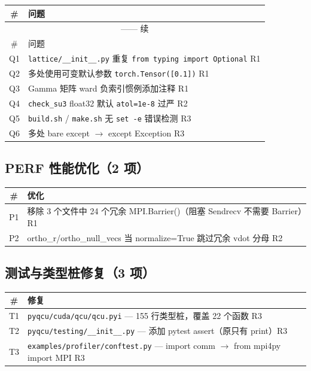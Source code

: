 \documentclass[11pt,a4paper]{article}
\newcommand{\perf}{\textcolor{severityperf}{\textbf{PERF}}}
\begin{document}
\begin{longtable}{cl}
\toprule
\# & 问题 \\
\midrule
\endfirsthead
\multicolumn{2}{c}{\tablename{} \thetable{} —— 续} \\
\midrule
\# & 问题 \\
\midrule
\endhead
\bottomrule
\endfoot
Q1 & \texttt{lattice/\_\_init\_\_.py} 重复 \texttt{from typing import Optional} \hfill R1 \\
Q2 & 多处使用可变默认参数 \texttt{torch.Tensor([0.1])} \hfill R1 \\
Q3 & Gamma 矩阵 ward 负索引惯例添加注释 \hfill R1 \\
Q4 & \texttt{check\_su3} float32 默认 \texttt{atol=1e-8} 过严 \hfill R2 \\
Q5 & \texttt{build.sh} / \texttt{make.sh} 无 \texttt{set -e} 错误检测 \hfill R3 \\
Q6 & 多处 bare except $\rightarrow$ except Exception \hfill R3 \\
\end{longtable}

\subsection{\perf{} 性能优化（2 项）}

\begin{longtable}{cl}
\toprule
\# & 优化 \\
\midrule
\endfirsthead
\bottomrule
\endfoot
P1 & 移除 3 个文件中 24 个冗余 MPI.Barrier()（阻塞 Sendrecv 不需要 Barrier）\hfill R1 \\
P2 & ortho\_r/ortho\_null\_vecs 当 normalize=True 跳过冗余 vdot 分母 \hfill R2 \\
\end{longtable}

\subsection{测试与类型桩修复（3 项）}

\begin{longtable}{cl}
\toprule
\# & 修复 \\
\midrule
\endfirsthead
\bottomrule
\endfoot
T1 & \texttt{pyqcu/cuda/qcu/qcu.pyi} — 155 行类型桩，覆盖 22 个函数 \hfill R3 \\
T2 & \texttt{pyqcu/testing/\_\_init\_\_.py} — 添加 pytest assert（原只有 print）\hfill R3 \\
T3 & \texttt{examples/profiler/conftest.py} — import comm $\rightarrow$ from mpi4py import MPI \hfill R3 \\
\end{longtable}
\end{document}
